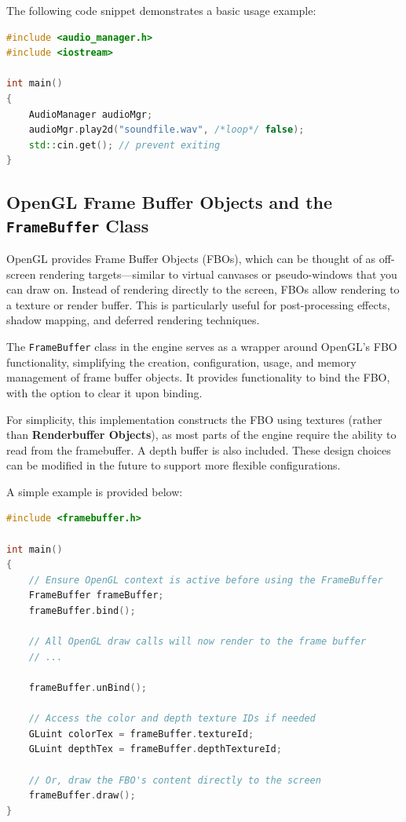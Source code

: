 The following code snippet demonstrates a basic usage example:

\begin{lstlisting}[language={C++}]
#include <audio_manager.h>
#include <iostream>

int main() 
{
    AudioManager audioMgr;
    audioMgr.play2d("soundfile.wav", /*loop*/ false);
    std::cin.get(); // prevent exiting
}
\end{lstlisting}



\subsection{OpenGL Frame Buffer Objects and the \texttt{FrameBuffer} Class}

OpenGL provides Frame Buffer Objects (FBOs), which can be thought of as off-screen rendering targets—similar to virtual canvases or pseudo-windows that you can draw on. Instead of rendering directly to the screen, FBOs allow rendering to a texture or render buffer. This is particularly useful for post-processing effects, shadow mapping, and deferred rendering techniques.

The \texttt{FrameBuffer} class in the engine serves as a wrapper around OpenGL’s FBO functionality, simplifying the creation, configuration, usage, and memory management of frame buffer objects. It provides functionality to bind the FBO, with the option to clear it upon binding.

For simplicity, this implementation constructs the FBO using textures (rather than \textbf{Renderbuffer Objects}), as most parts of the engine require the ability to read from the framebuffer. A depth buffer is also included. These design choices can be modified in the future to support more flexible configurations.

A simple example is provided below:

\begin{lstlisting}[language={C++}]
#include <framebuffer.h>

int main() 
{
    // Ensure OpenGL context is active before using the FrameBuffer
    FrameBuffer frameBuffer;
    frameBuffer.bind();

    // All OpenGL draw calls will now render to the frame buffer
    // ...

    frameBuffer.unBind();

    // Access the color and depth texture IDs if needed
    GLuint colorTex = frameBuffer.textureId;
    GLuint depthTex = frameBuffer.depthTextureId;

    // Or, draw the FBO's content directly to the screen
    frameBuffer.draw(); 
}
\end{lstlisting}


